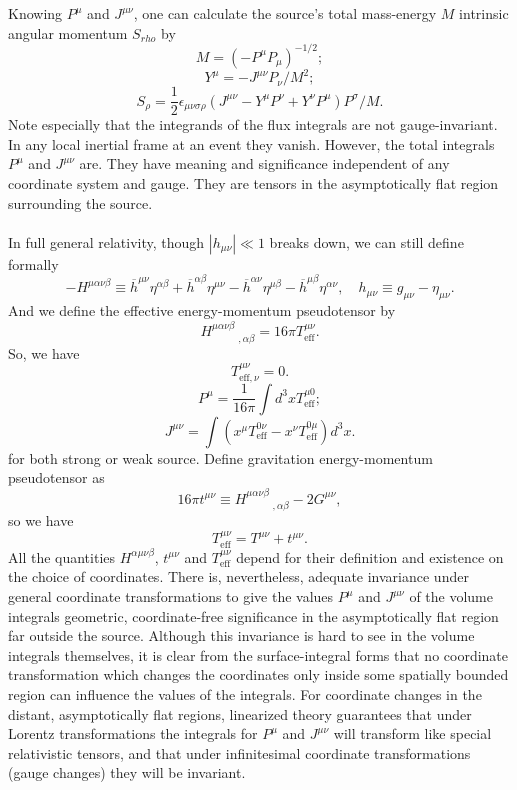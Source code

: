 \documentclass[cyan]{elegantnote}
\begin{document}
\noindent
Knowing $P^{\mu}$ and $J^{\mu\nu}$, one can calculate the source's total mass-energy $M$ intrinsic angular momentum $S_{rho}$ by
\[M = (-P^{\mu}P_{\mu})^{-1/2};\]
\[Y^{\mu} = -J^{\mu\nu}P_{\nu}/M^2;\]
\[S_{\rho} = \frac{1}{2}\epsilon_{\mu\nu\sigma\rho}(J^{\mu\nu} - Y^{\mu}P^{\nu} + Y^{\nu}P^{\mu})P^{\sigma}/M.\]
Note especially that the integrands of the flux integrals  are not gauge-invariant. In any local inertial frame at an event they vanish. 
However, the total integrals $P^{\mu}$ and $J^{\mu\nu}$ are. 
They have meaning and significance independent of any coordinate system and gauge. They are tensors in the asymptotically flat region surrounding the source.
\\ \\
In full general relativity, though $|h_{\mu\nu}| \ll 1$ breaks down, we can still define formally
\[-H^{\mu\alpha\nu\beta} \equiv \overline{h}^{\mu\nu}\eta^{\alpha\beta} + \overline{h}^{\alpha\beta}\eta^{\mu\nu} - \overline{h}^{\alpha\nu}\eta^{\mu\beta} - \overline{h}^{\mu\beta}\eta^{\alpha\nu} , \quad h_{\mu\nu} \equiv g_{\mu\nu} - \eta_{\mu\nu}.\]
And we define the effective energy-momentum pseudotensor by
\[H^{\mu\alpha\nu\beta}_{\phantom{****},\alpha
\beta} = 16\pi T^{\mu\nu}_{\mathrm{eff}}.\]
So, we have
\[T^{\mu\nu}_{\mathrm{eff},\nu} = 0.\]
\[P^{\mu} = \frac{1}{16\pi} \int d^3x T^{\mu0}_{\mathrm{eff}};\]
\[J^{\mu\nu} = \int (x^{\mu} T^{0\nu}_{\mathrm{eff}} - x^{\nu} T^{0\mu}_{\mathrm{eff}}) d^3x.\]
for both strong or weak source.
Define gravitation energy-momentum pseudotensor as
\[16\pi t^{\mu\nu} \equiv H^{\mu\alpha\nu\beta}_{\phantom{****},\alpha
\beta} - 2G^{\mu\nu},\]
so we have
\[T^{\mu\nu}_{\mathrm{eff}} = T^{\mu\nu} + t^{\mu\nu}.\]
All the quantities $H^{\alpha\mu\nu\beta}$, $t^{\mu\nu}$ and $T^{\mu\nu}_{\mathrm{eff}}$ depend for their definition and existence on the choice of coordinates.
There is, nevertheless, adequate invariance under general coordinate transformations to give the values $P^{\mu}$ and $J^{\mu\nu}$ of the volume integrals geometric, coordinate-free significance in the asymptotically flat region far outside the source.
Although this invariance is hard to see in the volume integrals themselves, it is clear from the surface-integral forms that no coordinate transformation which changes the coordinates only inside some spatially bounded region can influence the values of the integrals. 
For coordinate changes in the distant, asymptotically
flat regions, linearized theory guarantees that under Lorentz transformations the integrals for $P^{\mu}$ and $J^{\mu\nu}$ will transform like special relativistic tensors, and that under infinitesimal coordinate transformations (gauge changes) they will be invariant.
\end{document}
